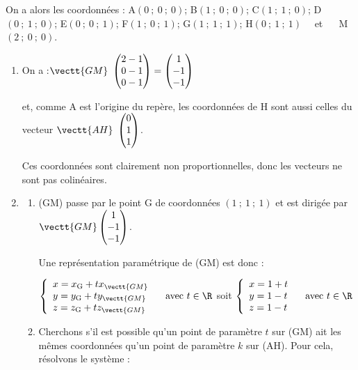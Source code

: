 On a alors les coordonnées : A$(0~;~0~;~0)$; \quad  B$(1~;~0~;~0)$; \quad  C$(1~;~1~;~0)$; \quad  D$(0~;~1~;~0)$; \quad  E$(0~;~0~;~1)$; \quad  F$(1~;~0~;~1)$; \quad  G$(1~;~1~;~1)$; \quad  H$(0~;~1~;~1)$ ~~et ~~ M$(2~;~0~;~0)$.

\begin{enumerate}
		\item On a :\quad $\vectt{GM}~\begin{pmatrix}2 - 1\\0-1\\0-1\end{pmatrix}= \begin{pmatrix}1\\-1\\-1\end{pmatrix}$

		et, comme A est l'origine du repère, les coordonnées de H sont aussi celles du vecteur $\vectt{AH} ~\begin{pmatrix}0\\1\\1\end{pmatrix}$.

		Ces coordonnées sont clairement non proportionnelles, donc les vecteurs ne sont pas colinéaires.

		\item
		\begin{enumerate}
			\item (GM) passe par le point G de coordonnées $(1~;~1~;~1)$ et est dirigée par $\vectt{GM}\begin{pmatrix}1\\-1\\-1\end{pmatrix}$.

			Une représentation paramétrique de (GM) est donc :

			$\left\{\begin{array}{l}x = x_{\mathrm{G}} + tx_{\vectt{GM}}\\y = y_{\mathrm{G}} + ty_{\vectt{GM}}\\z = z_{\mathrm{G}} + tz_{\vectt{GM}}\end{array}\right. \quad \text{avec } t \in \R$ \qquad soit \qquad
			$\left\{\begin{array}{l}x = 1 + t\\y = 1 - t\\z = 1 - t\end{array}\right. \quad \text{avec } t \in \R$

			\item Cherchons s'il est possible qu'un point de paramètre $t$ sur (GM) ait les mêmes coordonnées qu'un point de paramètre $k$ sur (AH). Pour cela, résolvons le système :


\end{enumerate}
\end{enumerate}
